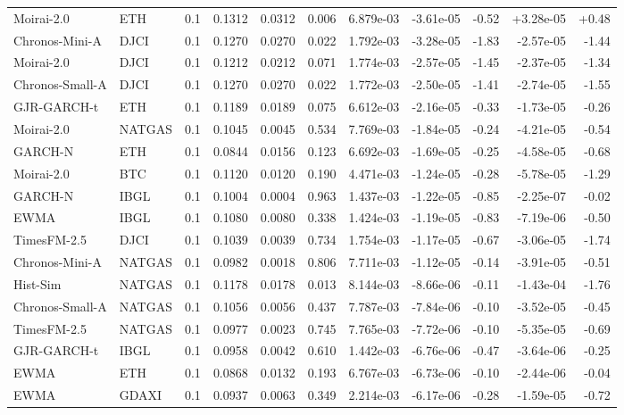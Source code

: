 \begin{tabular}{llrrrrrrrrr}
Moirai-2.0 & ETH & 0.1 & 0.1312 & 0.0312 & 0.006 & 6.879e-03 & -3.61e-05 & -0.52 & +3.28e-05 & +0.48 \\
Chronos-Mini-A & DJCI & 0.1 & 0.1270 & 0.0270 & 0.022 & 1.792e-03 & -3.28e-05 & -1.83 & -2.57e-05 & -1.44 \\
Moirai-2.0 & DJCI & 0.1 & 0.1212 & 0.0212 & 0.071 & 1.774e-03 & -2.57e-05 & -1.45 & -2.37e-05 & -1.34 \\
Chronos-Small-A & DJCI & 0.1 & 0.1270 & 0.0270 & 0.022 & 1.772e-03 & -2.50e-05 & -1.41 & -2.74e-05 & -1.55 \\
GJR-GARCH-t & ETH & 0.1 & 0.1189 & 0.0189 & 0.075 & 6.612e-03 & -2.16e-05 & -0.33 & -1.73e-05 & -0.26 \\
Moirai-2.0 & NATGAS & 0.1 & 0.1045 & 0.0045 & 0.534 & 7.769e-03 & -1.84e-05 & -0.24 & -4.21e-05 & -0.54 \\
GARCH-N & ETH & 0.1 & 0.0844 & 0.0156 & 0.123 & 6.692e-03 & -1.69e-05 & -0.25 & -4.58e-05 & -0.68 \\
Moirai-2.0 & BTC & 0.1 & 0.1120 & 0.0120 & 0.190 & 4.471e-03 & -1.24e-05 & -0.28 & -5.78e-05 & -1.29 \\
GARCH-N & IBGL & 0.1 & 0.1004 & 0.0004 & 0.963 & 1.437e-03 & -1.22e-05 & -0.85 & -2.25e-07 & -0.02 \\
EWMA & IBGL & 0.1 & 0.1080 & 0.0080 & 0.338 & 1.424e-03 & -1.19e-05 & -0.83 & -7.19e-06 & -0.50 \\
TimesFM-2.5 & DJCI & 0.1 & 0.1039 & 0.0039 & 0.734 & 1.754e-03 & -1.17e-05 & -0.67 & -3.06e-05 & -1.74 \\
Chronos-Mini-A & NATGAS & 0.1 & 0.0982 & 0.0018 & 0.806 & 7.711e-03 & -1.12e-05 & -0.14 & -3.91e-05 & -0.51 \\
Hist-Sim & NATGAS & 0.1 & 0.1178 & 0.0178 & 0.013 & 8.144e-03 & -8.66e-06 & -0.11 & -1.43e-04 & -1.76 \\
Chronos-Small-A & NATGAS & 0.1 & 0.1056 & 0.0056 & 0.437 & 7.787e-03 & -7.84e-06 & -0.10 & -3.52e-05 & -0.45 \\
TimesFM-2.5 & NATGAS & 0.1 & 0.0977 & 0.0023 & 0.745 & 7.765e-03 & -7.72e-06 & -0.10 & -5.35e-05 & -0.69 \\
GJR-GARCH-t & IBGL & 0.1 & 0.0958 & 0.0042 & 0.610 & 1.442e-03 & -6.76e-06 & -0.47 & -3.64e-06 & -0.25 \\
EWMA & ETH & 0.1 & 0.0868 & 0.0132 & 0.193 & 6.767e-03 & -6.73e-06 & -0.10 & -2.44e-06 & -0.04 \\
EWMA & GDAXI & 0.1 & 0.0937 & 0.0063 & 0.349 & 2.214e-03 & -6.17e-06 & -0.28 & -1.59e-05 & -0.72 \\

\end{tabular}
